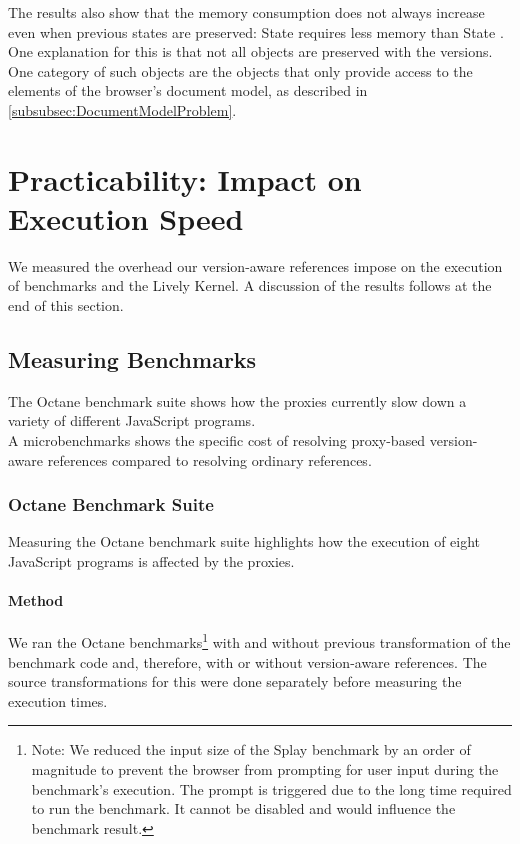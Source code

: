 The results also show that the memory consumption does not always increase even when previous states are preserved: State  requires less memory than State .
One explanation for this is that not all objects are preserved with the versions.
One category of such objects are the objects that only provide access to the elements of the browser's document model, as described in \ref{subsubsec:DocumentModelProblem}.


\section{Practicability: Impact on Execution Speed} \label{sec:EVALUATION:4}

We measured the overhead our version-aware references impose on the execution of benchmarks and the Lively Kernel.
A discussion of the results follows at the end of this section.


\subsection{Measuring Benchmarks}

The Octane benchmark suite shows how the proxies currently slow down a variety of different JavaScript programs.\\
A microbenchmarks shows the specific cost of resolving proxy-based version-aware references compared to resolving ordinary references.

\subsubsection{Octane Benchmark Suite}

Measuring the Octane benchmark suite highlights how the execution of eight JavaScript programs is affected by the proxies.

\paragraph{Method}
We ran the Octane benchmarks\footnote{Note: We reduced the input size of the Splay benchmark by an order of magnitude to prevent the browser from prompting for user input during the benchmark's execution. The prompt is triggered due to the long time required to run the benchmark. It cannot be disabled and would influence the benchmark result.} with and without previous transformation of the benchmark code and, therefore, with or without version-aware references.
The source transformations for this were done separately before measuring the execution times.

